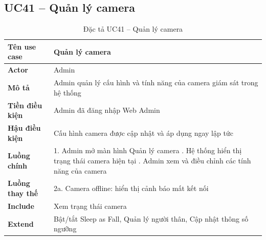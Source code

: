 \subsection*{UC41 -- Quản lý camera}
\begin{table}[H]
    \captionsetup{justification=raggedright, singlelinecheck=false}
    \caption{Đặc tả UC41 -- Quản lý camera}
\centering
\begin{tabular}{|p{3.5cm}|p{10cm}|}
\hline
\textbf{Tên use case} & Quản lý camera \\
\hline
\textbf{Actor} & Admin \\
\hline
\textbf{Mô tả} & Admin quản lý cấu hình và tính năng của
  camera giám sát trong hệ thống \\
\hline
\textbf{Tiền điều kiện} & Admin đã đăng nhập Web Admin \\
\hline
\textbf{Hậu điều kiện} & Cấu hình camera được cập nhật
  và áp dụng ngay lập tức \\
\hline
\textbf{Luồng chính} &
  1. Admin mở màn hình Quản lý camera \newline
  2. Hệ thống hiển thị trạng thái camera hiện tại \newline
  3. Admin xem và điều chỉnh các tính năng của camera \\
\hline
\textbf{Luồng thay thế} &
  2a. Camera offline: hiển thị cảnh báo mất kết nối \\
\hline
\textbf{Include} & Xem trạng thái camera \\
\hline
\textbf{Extend} & Bật/tắt Sleep as Fall,
  Quản lý người thân, Cập nhật thông số ngưỡng \\
\hline
\end{tabular}

\end{table}


